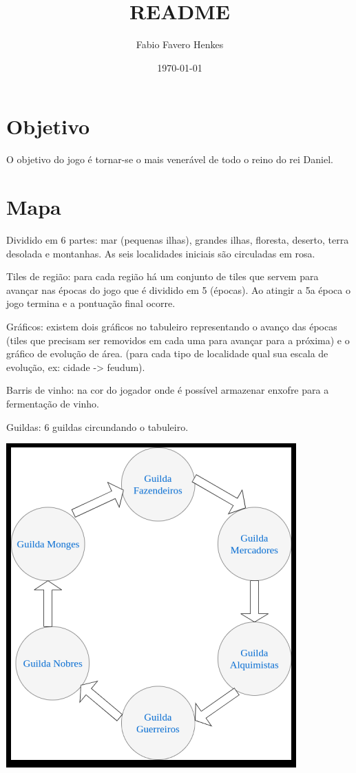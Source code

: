 \documentclass[11pt]{article}
\author{Fabio Favero Henkes}
\date{\today}
\title{README}
\begin{document}
\maketitle
\tableofcontents

\section{Objetivo}
\label{sec-1}

O objetivo do jogo é tornar-se o mais venerável de todo o reino do rei Daniel.

\section{Mapa}
\label{sec-2}

Dividido em 6 partes: mar (pequenas ilhas), grandes ilhas, floresta, deserto, terra desolada e montanhas. As seis localidades iniciais são circuladas em rosa.

Tiles de região: para cada região há um conjunto de tiles que servem para avançar nas épocas do jogo que é dividido em 5 (épocas). Ao atingir a 5a época o jogo termina e a pontuação final ocorre.

Gráficos: existem dois gráficos no tabuleiro representando o avanço das épocas (tiles que precisam ser removidos em cada uma para avançar para a próxima) e o gráfico de evolução de área.
(para cada tipo de localidade qual sua escala de evolução, ex: cidade -> feudum).

Barris de vinho: na cor do jogador onde é possível armazenar enxofre para a fermentação de vinho.

Guildas: 6 guildas circundando o tabuleiro.

\includegraphics[width=.9\linewidth]{./img/guilds.png}
\end{document}
